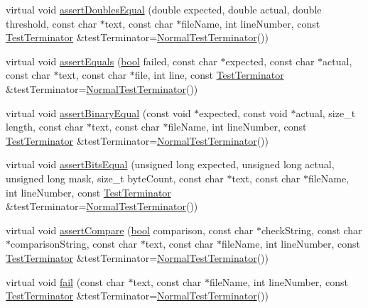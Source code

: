 \begin{DoxyCompactItemize}
\item 
virtual void \hyperlink{class_utest_shell_a6bfdff112553fb1e8414903c2d4a0858}{assert\+Doubles\+Equal} (double expected, double actual, double threshold, const char $\ast$text, const char $\ast$file\+Name, int line\+Number, const \hyperlink{class_test_terminator}{Test\+Terminator} \&test\+Terminator=\hyperlink{class_normal_test_terminator}{Normal\+Test\+Terminator}())
\item 
virtual void \hyperlink{class_utest_shell_aeecd2ef3112bdf517a53d945cf0a818d}{assert\+Equals} (\hyperlink{avb__gptp_8h_af6a258d8f3ee5206d682d799316314b1}{bool} failed, const char $\ast$expected, const char $\ast$actual, const char $\ast$text, const char $\ast$file, int line, const \hyperlink{class_test_terminator}{Test\+Terminator} \&test\+Terminator=\hyperlink{class_normal_test_terminator}{Normal\+Test\+Terminator}())
\item 
virtual void \hyperlink{class_utest_shell_a6dbe5191c5d05ec4a24eb51c76f79dfa}{assert\+Binary\+Equal} (const void $\ast$expected, const void $\ast$actual, size\+\_\+t length, const char $\ast$text, const char $\ast$file\+Name, int line\+Number, const \hyperlink{class_test_terminator}{Test\+Terminator} \&test\+Terminator=\hyperlink{class_normal_test_terminator}{Normal\+Test\+Terminator}())
\item 
virtual void \hyperlink{class_utest_shell_a95aea59049d74e55ea6c4f93e1102856}{assert\+Bits\+Equal} (unsigned long expected, unsigned long actual, unsigned long mask, size\+\_\+t byte\+Count, const char $\ast$text, const char $\ast$file\+Name, int line\+Number, const \hyperlink{class_test_terminator}{Test\+Terminator} \&test\+Terminator=\hyperlink{class_normal_test_terminator}{Normal\+Test\+Terminator}())
\item 
virtual void \hyperlink{class_utest_shell_ace2ccdca6c6f8622960979f25304c013}{assert\+Compare} (\hyperlink{avb__gptp_8h_af6a258d8f3ee5206d682d799316314b1}{bool} comparison, const char $\ast$check\+String, const char $\ast$comparison\+String, const char $\ast$text, const char $\ast$file\+Name, int line\+Number, const \hyperlink{class_test_terminator}{Test\+Terminator} \&test\+Terminator=\hyperlink{class_normal_test_terminator}{Normal\+Test\+Terminator}())
\item 
virtual void \hyperlink{class_utest_shell_a551151a34264d19c3954dab0948ea186}{fail} (const char $\ast$text, const char $\ast$file\+Name, int line\+Number, const \hyperlink{class_test_terminator}{Test\+Terminator} \&test\+Terminator=\hyperlink{class_normal_test_terminator}{Normal\+Test\+Terminator}())

\end{DoxyCompactItemize}
